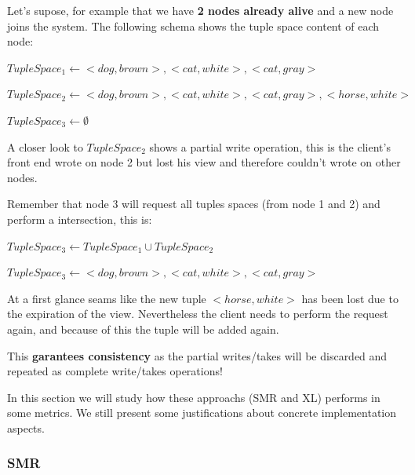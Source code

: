 \documentclass[times, 10pt,twocolumn]{article}
\begin{document}
Let's supose, for example that we have \textbf{2 nodes already alive} and a new node joins the system.
The following schema shows the tuple space content of each node:

$ TupleSpace_{1} \leftarrow <dog, brown>, <cat, white>, <cat, gray> $

$ TupleSpace_{2} \leftarrow <dog, brown>, <cat, white>, <cat, gray>, <horse, white> $

$ TupleSpace_{3} \leftarrow \emptyset $

A closer look to $TupleSpace_{2}$ shows a partial write operation, this is
the client's front end wrote on node 2 but lost his view and therefore couldn't wrote on other nodes.

Remember that node 3 will request all tuples spaces (from node 1 and 2) and perform a intersection, this is:

$ TupleSpace_{3} \leftarrow TupleSpace_{1} \cup TupleSpace_{2} $

$ TupleSpace_{3} \leftarrow <dog, brown>, <cat, white>, <cat, gray>$

At a first glance seams like the new tuple $<horse, white>$ has been lost due 
to the expiration of the view. Nevertheless the client needs to perform the 
request again, and because of this the tuple will be added again.

This \textbf{garantees consistency} as the partial writes/takes will be discarded
and repeated as complete write/takes operations!


In this section we will study how these approachs (SMR and XL) performs in some metrics.
We still present some justifications about concrete implementation aspects.

\subsubsection{SMR}

\end{document}
